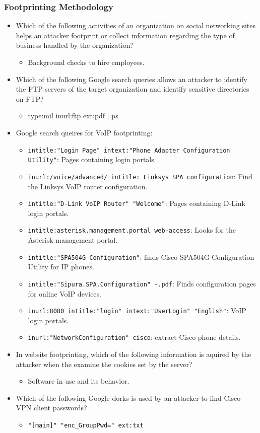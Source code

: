\subsubsection{Footprinting Methodology}
\begin{itemize}
    \item Which of the following activities of an organization on social networking sites helps an attacker footprint or collect information regarding the type of business handled by the organization?
    \begin{itemize}
        \item Background checks to hire employees.
    \end{itemize}
    \item Which of the following Google search queries allows an attacker to identify the FTP servers of the target organization and identify sensitive directories on FTP?
    \begin{itemize}
        \item type:mil inurl:ftp ext:pdf | ps
    \end{itemize}
    \item Google search queires for VoIP footprinting:
    \begin{itemize}
        \item \verb|intitle:"Login Page" intext:"Phone Adapter Configuration Utility"|: Pages containing login portals
        \item \verb|inurl:/voice/advanced/ intitle: Linksys SPA configuration|: Find the Linksys VoIP router configuration.
        \item \verb|intitle:"D-Link VoIP Router" "Welcome"|: Pages containing D-Link login portals.
        \item \verb|intitle:asterisk.management.portal web-access|: Looks for the Asterisk management portal.
        \item \verb|intitle:"SPA504G Configuration"|: finds Cisco SPA504G Configuration Utility for IP phones.
        \item \verb|intitle:"Sipura.SPA.Configuration" -.pdf|: Finds configuration pages for online VoIP devices.
        \item \verb|inurl:8080 intitle:"login" intext:"UserLogin" "English"|: VoIP login portals.
        \item \verb|inurl:"NetworkConfiguration" cisco|: extract Cisco phone details.
    \end{itemize}
    \item In website footprinting, which of the following information is aquired by the attacker when the examine the cookies set by the server?
    \begin{itemize}
        \item Software in use and its behavior.
    \end{itemize}
    \item Which of the following Google dorks is used by an attacker to find Cisco VPN client passwords?
    \begin{itemize}
        \item \verb|"[main]" "enc_GroupPwd=" ext:txt|
    \end{itemize}
\end{itemize}

